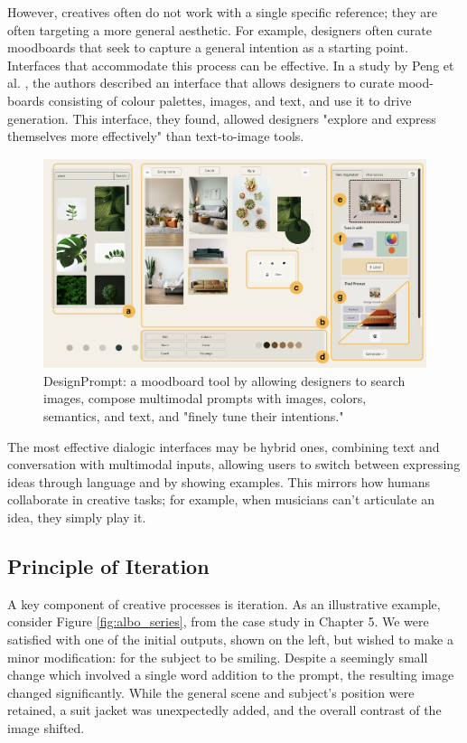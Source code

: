 However, creatives often do not work with a single specific reference; they are often targeting a more general aesthetic. For example, designers often curate moodboards that seek to capture a general intention as a starting point. Interfaces that accommodate this process can be effective. In a study by Peng et al. \cite{Peng2024-tr}, the authors described an interface that allows designers to curate mood-boards consisting of colour palettes, images, and text, and use it to drive generation. This interface, they found, allowed designers "explore and express themselves more effectively" than text-to-image tools.

\begin{figure}
    \centering
    \includegraphics[width=1\linewidth]{designprompt.png}
    \caption{DesignPrompt: a moodboard tool by \cite{Peng2024-tr} allowing designers to search images, compose multimodal prompts with images, colors, semantics, and text, and "finely tune their intentions."}
    \label{fig:enter-label}
\end{figure}

The most effective dialogic interfaces may be hybrid ones, combining text and conversation with multimodal inputs, allowing users to switch between expressing ideas through language and by showing examples. This mirrors how humans collaborate in creative tasks; for example, when musicians can't articulate an idea, they simply play it.

\subsection{Principle of Iteration}

A key component of creative processes is iteration.  As an illustrative example, consider Figure \ref{fig:albo_series}, from the case study in Chapter 5. We were satisfied with one of the initial outputs, shown on the left, but wished to make a minor modification: for the subject to be smiling. Despite a seemingly small change which involved a single word addition to the prompt, the resulting image changed significantly. While the general scene and subject's position were retained, a suit jacket was unexpectedly added, and the overall contrast of the image shifted. 

